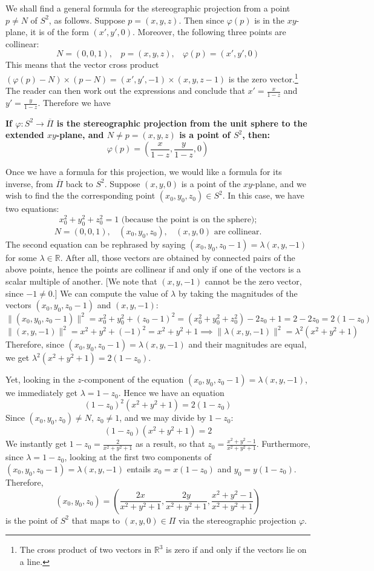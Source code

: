 \documentclass[leqno]{book}
\begin{document}
We shall find a general formula for the stereographic projection from a point $p\ne N$ of $S^2$, as follows.  Suppose $p=(x,y,z)$.  Then since $\varphi(p)$ is in the $xy$-plane, it is of the form $(x',y',0)$.  Moreover, the following three points are collinear:
$$N=(0,0,1),~~~~p=(x,y,z),~~~~\varphi(p)=(x',y',0)$$
This means that the vector cross product $(\varphi(p)-N)\times(p-N)=(x',y',-1)\times(x,y,z-1)$ is the zero vector.\footnote{The cross product of two vectors in $\mathbb R^3$ is zero if and only if the vectors lie on a line.}  The reader can then work out the expressions and conclude that $x'=\frac x{1-z}$ and $y'=\frac y{1-z}$.  Therefore we have
\begin{center}
\textbf{If $\varphi:S^2\to\overline{\Pi}$ is the stereographic projection from the unit sphere to the extended $xy$-plane, and $N\ne p=(x,y,z)$ is a point of $S^2$, then:}
\begin{equation}\tag{F1}\varphi(p)=\left(\frac x{1-z},\frac y{1-z},0\right)\end{equation}
\end{center}
Once we have a formula for this projection, we would like a formula for its inverse, from $\overline{\Pi}$ back to $S^2$.  Suppose $(x,y,0)$ is a point of the $xy$-plane, and we wish to find the the corresponding point $(x_0,y_0,z_0)\in S^2$.  In this case, we have two equations:
$$x_0^2+y_0^2+z_0^2=1\text{ (because the point is on the sphere);}$$
$$N=(0,0,1),~~~~(x_0,y_0,z_0),~~~~(x,y,0)\text{ are collinear.}$$
The second equation can be rephrased by saying $(x_0,y_0,z_0-1)=\lambda(x,y,-1)$ for some $\lambda\in\mathbb R$.  After all, those vectors are obtained by connected pairs of the above points, hence the points are collinear if and only if one of the vectors is a scalar multiple of another.  [We note that $(x,y,-1)$ cannot be the zero vector, since $-1\ne 0$.]  We can compute the value of $\lambda$ by taking the magnitudes of the vectors $(x_0,y_0,z_0-1)$ and $(x,y,-1)$:
$$\|(x_0,y_0,z_0-1)\|^2=x_0^2+y_0^2+(z_0-1)^2=(x_0^2+y_0^2+z_0^2)-2z_0+1=2-2z_0=2(1-z_0)$$
$$\|(x,y,-1)\|^2=x^2+y^2+(-1)^2=x^2+y^2+1\implies\|\lambda(x,y,-1)\|^2=\lambda^2(x^2+y^2+1)$$
Therefore, since $(x_0,y_0,z_0-1)=\lambda(x,y,-1)$ and their magnitudes are equal, we get $\lambda^2(x^2+y^2+1)=2(1-z_0)$.

Yet, looking in the $z$-component of the equation $(x_0,y_0,z_0-1)=\lambda(x,y,-1)$, we immediately get $\lambda=1-z_0$.  Hence we have an equation
$$(1-z_0)^2(x^2+y^2+1)=2(1-z_0)$$
Since $(x_0,y_0,z_0)\ne N$, $z_0\ne 1$, and we may divide by $1-z_0$:
$$(1-z_0)(x^2+y^2+1)=2$$
We instantly get $1-z_0=\frac 2{x^2+y^2+1}$ as a result, so that $z_0=\frac{x^2+y^2-1}{x^2+y^2+1}$.  Furthermore, since $\lambda=1-z_0$, looking at the first two components of $(x_0,y_0,z_0-1)=\lambda(x,y,-1)$ entails $x_0=x(1-z_0)$ and $y_0=y(1-z_0)$.  Therefore,
\begin{equation}\tag{F2}(x_0,y_0,z_0)=\left(\frac{2x}{x^2+y^2+1},\frac{2y}{x^2+y^2+1},\frac{x^2+y^2-1}{x^2+y^2+1}\right)\end{equation}
is the point of $S^2$ that maps to $(x,y,0)\in\Pi$ via the stereographic projection $\varphi$.
\end{document}
